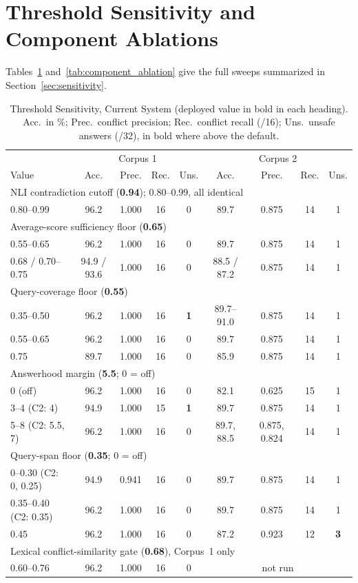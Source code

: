 \documentclass[conference]{IEEEtran}
\begin{document}
\section{Threshold Sensitivity and Component Ablations}
\label{app:sweeps}

Tables~\ref{tab:sensitivity} and~\ref{tab:component_ablation} give the
full sweeps summarized in Section~\ref{sec:sensitivity}.

\begin{table}[t]
\caption{Threshold Sensitivity, Current System (deployed value in bold in
each heading). Acc.\ in \%; Prec.\ conflict precision; Rec.\ conflict
recall (/16); Uns.\ unsafe answers (/32), in bold where above the
default.}
\label{tab:sensitivity}
\centering
\small
\begin{tabular}{l c c c c c c c c}
\toprule
 & \multicolumn{4}{c}{Corpus 1} & \multicolumn{4}{c}{Corpus 2} \\
Value & Acc. & Prec. & Rec. & Uns. & Acc. & Prec. & Rec. & Uns. \\
\midrule
\multicolumn{9}{l}{NLI contradiction cutoff (\textbf{0.94}); 0.80--0.99, all identical} \\
0.80--0.99 & 96.2 & 1.000 & 16 & 0 & 89.7 & 0.875 & 14 & 1 \\
\multicolumn{9}{l}{Average-score sufficiency floor (\textbf{0.65})} \\
0.55--0.65 & 96.2 & 1.000 & 16 & 0 & 89.7 & 0.875 & 14 & 1 \\
0.68 / 0.70--0.75 & 94.9 / 93.6 & 1.000 & 16 & 0 & 88.5 / 87.2 & 0.875 & 14 & 1 \\
\multicolumn{9}{l}{Query-coverage floor (\textbf{0.55})} \\
0.35--0.50 & 96.2 & 1.000 & 16 & \textbf{1} & 89.7--91.0 & 0.875 & 14 & 1 \\
0.55--0.65 & 96.2 & 1.000 & 16 & 0 & 89.7 & 0.875 & 14 & 1 \\
0.75 & 89.7 & 1.000 & 16 & 0 & 85.9 & 0.875 & 14 & 1 \\
\multicolumn{9}{l}{Answerhood margin (\textbf{5.5}; 0 = off)} \\
0 (off) & 96.2 & 1.000 & 16 & 0 & 82.1 & 0.625 & 15 & 1 \\
3--4 (C2: 4) & 94.9 & 1.000 & 15 & \textbf{1} & 89.7 & 0.875 & 14 & 1 \\
5--8 (C2: 5.5, 7) & 96.2 & 1.000 & 16 & 0 & 89.7, 88.5 & 0.875, 0.824 & 14 & 1 \\
\multicolumn{9}{l}{Query-span floor (\textbf{0.35}; 0 = off)} \\
0--0.30 (C2: 0, 0.25) & 94.9 & 0.941 & 16 & 0 & 89.7 & 0.875 & 14 & 1 \\
0.35--0.40 (C2: 0.35) & 96.2 & 1.000 & 16 & 0 & 89.7 & 0.875 & 14 & 1 \\
0.45 & 96.2 & 1.000 & 16 & 0 & 87.2 & 0.923 & 12 & \textbf{3} \\
\multicolumn{9}{l}{Lexical conflict-similarity gate (\textbf{0.68}), Corpus~1 only} \\
0.60--0.76 & 96.2 & 1.000 & 16 & 0 & \multicolumn{4}{c}{not run} \\
\bottomrule
\end{tabular}
\end{table}
\end{document}
